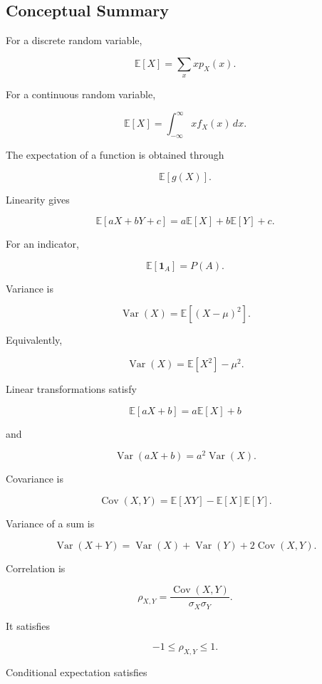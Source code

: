 \subsection{Conceptual Summary}
\label{subsec:expectation-moments-summary}

For a discrete random variable,

\[
\boxed{
\mathbb{E}[X]
=
\sum_x
xp_X(x).
}
\]

For a continuous random variable,

\[
\boxed{
\mathbb{E}[X]
=
\int_{-\infty}^{\infty}
xf_X(x)\,dx.
}
\]

The expectation of a function is obtained through

\[
\boxed{
\mathbb{E}[g(X)].
}
\]

Linearity gives

\[
\boxed{
\mathbb{E}[aX+bY+c]
=
a\mathbb{E}[X]
+
b\mathbb{E}[Y]
+
c.
}
\]

For an indicator,

\[
\boxed{
\mathbb{E}[\mathbf{1}_A]
=
P(A).
}
\]

Variance is

\[
\boxed{
\operatorname{Var}(X)
=
\mathbb{E}[(X-\mu)^2].
}
\]

Equivalently,

\[
\boxed{
\operatorname{Var}(X)
=
\mathbb{E}[X^2]-\mu^2.
}
\]

Linear transformations satisfy

\[
\boxed{
\mathbb{E}[aX+b]
=
a\mathbb{E}[X]+b
}
\]

and

\[
\boxed{
\operatorname{Var}(aX+b)
=
a^2\operatorname{Var}(X).
}
\]

Covariance is

\[
\boxed{
\operatorname{Cov}(X,Y)
=
\mathbb{E}[XY]
-
\mathbb{E}[X]\mathbb{E}[Y].
}
\]

Variance of a sum is

\[
\boxed{
\operatorname{Var}(X+Y)
=
\operatorname{Var}(X)
+
\operatorname{Var}(Y)
+
2\operatorname{Cov}(X,Y).
}
\]

Correlation is

\[
\boxed{
\rho_{X,Y}
=
\frac{
\operatorname{Cov}(X,Y)
}{
\sigma_X\sigma_Y
}.
}
\]

It satisfies

\[
\boxed{
-1\leq\rho_{X,Y}\leq1.
}
\]

Conditional expectation satisfies


